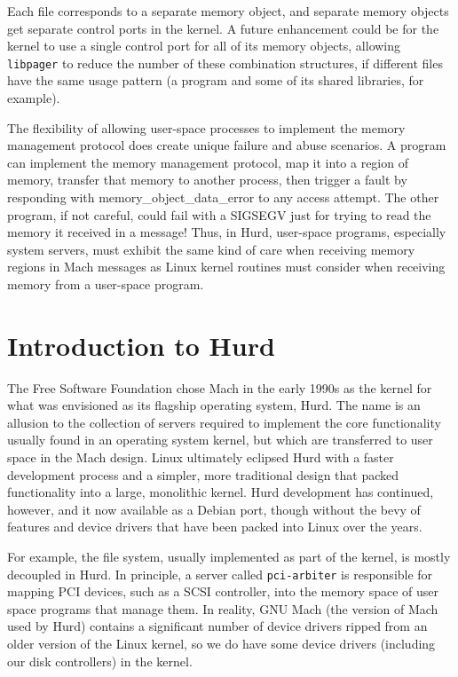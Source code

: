 \documentclass{article}
\def\libpager{{\tt libpager}\xspace}
\begin{document}
Each file corresponds to a separate memory object, and separate memory
objects get separate control ports in the kernel.  A future
enhancement could be for the kernel to use a single control port for
all of its memory objects, allowing \libpager to reduce the number of
these combination structures, if different files have the same usage
pattern (a program and some of its shared libraries, for example).

The flexibility of allowing user-space processes to implement the
memory management protocol does create unique failure and abuse
scenarios.  A program can implement the memory management protocol,
map it into a region of memory, transfer that memory to another
process, then trigger a fault by responding with
memory_object_data_error to any access attempt.  The other program, if
not careful, could fail with a SIGSEGV just for trying to read the
memory it received in a message!  Thus, in Hurd, user-space programs,
especially system servers, must exhibit the same kind of care when
receiving memory regions in Mach messages as Linux kernel routines
must consider when receiving memory from a user-space program.


\section{Introduction to Hurd}

The Free Software Foundation chose Mach in the early 1990s as the
kernel for what was envisioned as its flagship operating system, Hurd.
The name is an allusion to the collection of servers required to
implement the core functionality usually found in an operating system
kernel, but which are transferred to user space in the Mach design.
Linux ultimately eclipsed Hurd with a faster development process and a
simpler, more traditional design that packed functionality into a
large, monolithic kernel.  Hurd development has continued, however,
and it now available as a Debian port, though without the bevy of
features and device drivers that have been packed into Linux over the
years.

For example, the file system, usually implemented as part of the
kernel, is mostly decoupled in Hurd.  In principle, a server called
{\tt pci-arbiter} is responsible for mapping PCI devices, such as
a SCSI controller, into the memory space of user space programs that
manage them.  In reality, GNU Mach (the version of Mach used by Hurd)
contains a significant number of device drivers ripped from an older
version of the Linux kernel, so we do have some device drivers
(including our disk controllers) in the kernel.
\end{document}
